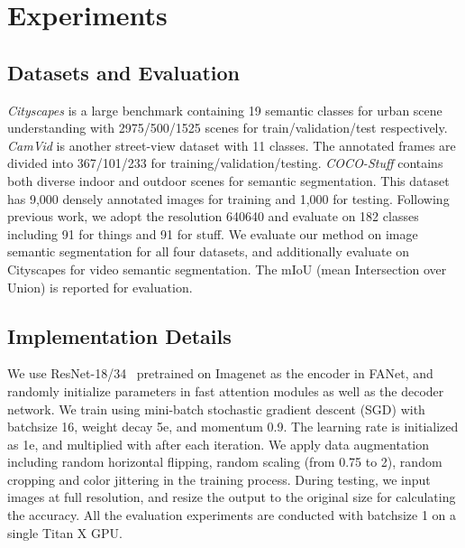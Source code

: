 \section{Experiments}
\subsection{Datasets and Evaluation}
\textit{Cityscapes}\cite{cordts2016cityscapes} is a large benchmark containing 19 semantic classes for urban scene understanding with 2975/500/1525 scenes for train/validation/test respectively. \textit{CamVid}\cite{brostow2008segmentation} is another street-view dataset with 11 classes. The annotated frames are divided into 367/101/233 for training/validation/testing. \textit{COCO-Stuff}\cite{caesar2018coco} contains both diverse indoor and outdoor scenes for semantic segmentation. This dataset has 9,000 densely annotated images for training and 1,000 for testing.  Following previous work\cite{zhao2018icnet}, we adopt the resolution 640640 and evaluate on 182 classes including 91 for things and 91 for stuff. 
We evaluate our method on image semantic segmentation for all four datasets, and additionally evaluate on Cityscapes for video semantic segmentation. The mIoU (mean Intersection over Union) is reported for evaluation.




\subsection{Implementation Details}


We use ResNet-18/34~\cite{he2016deep} pretrained on Imagenet as the encoder in FANet, and randomly initialize parameters in fast attention modules as well as the decoder network.
We train using mini-batch stochastic gradient descent (SGD) with batchsize 16, weight decay 5e, and momentum 0.9. The learning rate is initialized as 1e, and multiplied with  after each iteration.
We apply data augmentation including random horizontal flipping, random scaling (from 0.75 to 2), random cropping and color jittering in the training process.
During testing, we input images at full resolution, and resize the output to the original size for calculating the accuracy.
All the evaluation experiments are conducted with batchsize 1 on a single Titan X GPU. 





